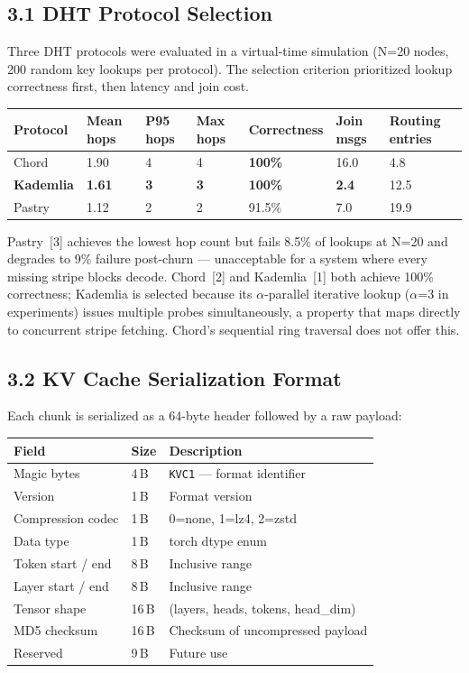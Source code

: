 \documentclass[11pt]{article}
\begin{document}
\subsection{3.1 DHT Protocol Selection}

Three DHT protocols were evaluated in a virtual-time simulation (N=20
nodes, 200 random key lookups per protocol). The selection criterion
prioritized lookup correctness first, then latency and join cost.

\begin{longtable}[]{@{}lllllll@{}}
\toprule
Protocol & Mean hops & P95 hops & Max hops & Correctness & Join msgs & Routing entries \\
\midrule
\endhead
\bottomrule
\endlastfoot
Chord & 1.90 & 4 & 4 & \textbf{100\%} & 16.0 & 4.8 \\
\textbf{Kademlia} & \textbf{1.61} & \textbf{3} & \textbf{3} & \textbf{100\%} & \textbf{2.4} & 12.5 \\
Pastry & 1.12 & 2 & 2 & 91.5\% & 7.0 & 19.9 \\
\end{longtable}

Pastry~[3] achieves the lowest hop count but fails 8.5\% of lookups at
N=20 and degrades to 9\% failure post-churn --- unacceptable for a
system where every missing stripe blocks decode. Chord~[2] and
Kademlia~[1] both achieve 100\% correctness; Kademlia is selected because
its $\alpha$-parallel iterative lookup ($\alpha$=3 in experiments) issues
multiple probes simultaneously, a property that maps directly to
concurrent stripe fetching. Chord's sequential ring traversal does not
offer this.

\subsection{3.2 KV Cache Serialization Format}

Each chunk is serialized as a 64-byte header followed by a raw payload:

\begin{longtable}[]{@{}lll@{}}
\toprule
Field & Size & Description \\
\midrule
\endhead
\bottomrule
\endlastfoot
Magic bytes & 4\,B & \texttt{KVC1} --- format identifier \\
Version & 1\,B & Format version \\
Compression codec & 1\,B & 0=none, 1=lz4, 2=zstd \\
Data type & 1\,B & torch dtype enum \\
Token start / end & 8\,B & Inclusive range \\
Layer start / end & 8\,B & Inclusive range \\
Tensor shape & 16\,B & (layers, heads, tokens, head\_dim) \\
MD5 checksum & 16\,B & Checksum of uncompressed payload \\
Reserved & 9\,B & Future use \\
\end{longtable}
\end{document}

